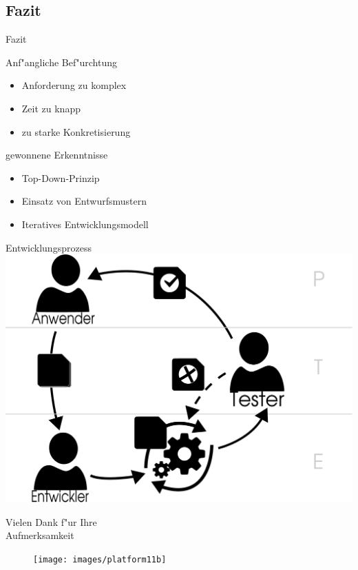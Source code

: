 \subsection{Fazit}
\begin{frame}[<+->]{Fazit}
\begin{block}{Anf"angliche Bef"urchtung}
\begin{itemize}
\item{Anforderung zu komplex}
\item{Zeit zu knapp}
\item{zu starke Konkretisierung}
\end{itemize}
\end{block}
\begin{block}{gewonnene Erkenntnisse}
\begin{itemize}
\item{Top-Down-Prinzip}
\item{Einsatz von Entwurfsmustern}
\item{Iteratives Entwicklungsmodell}
\end{itemize}
\end{block}
\end{frame}

\begin{frame}{Entwicklungsprozess}
\includegraphics[width=\textwidth]{FDD5}
\end{frame}

\begin{frame}{}
\begin{center}
\huge{Vielen Dank f"ur Ihre\\Aufmerksamkeit}\\
\begin{figure}[b!]
\texttt{[image: images/platform11b]}
\end{figure}
\end{center}
\end{frame}



